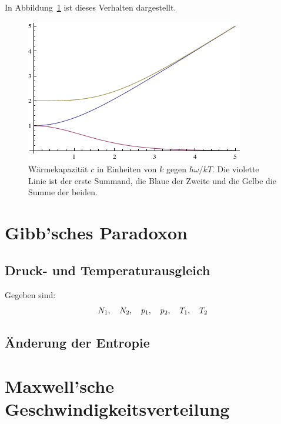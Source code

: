 In Abbildung~\ref{fig:1d-c} ist dieses Verhalten dargestellt.

\begin{figure}[htbp]
    \centering
    \includegraphics[width=0.6\linewidth]{1d.png}
    \caption{%
        Wärmekapazität $c$ in Einheiten von $k$ gegen $\hbar\omega / kT$. Die
        violette Linie ist der erste Summand, die Blaue der Zweite und die
        Gelbe die Summe der beiden.
    }
    \label{fig:1d-c}
\end{figure}

\section{Gibb'sches Paradoxon}

\subsection{Druck- und Temperaturausgleich}

Gegeben sind:
\[
    N_1
    ,\quad
    N_2
    ,\quad
    p_1
    ,\quad
    p_2
    ,\quad
    T_1
    ,\quad
    T_2
\]

\subsection{Änderung der Entropie}

\section{Maxwell'sche Geschwindigkeitsverteilung}


\IfFileExists{\bibliographyfile}{
    \printbibliography
}{}



